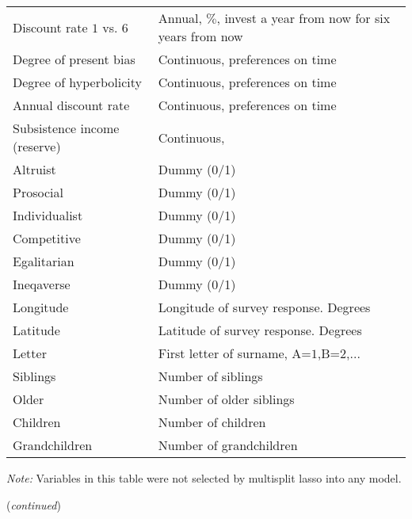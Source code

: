 \documentclass[a4paper,12pt]{article}
\begin{document}
{\begin{threeparttable}
\begin{small}
\begin{tabular}{ll}
\vspace{0.15cm}Discount rate $1$ vs. $6$&Annual, $\%$, invest a year from now for six years from now \\
\vspace{0.15cm}Degree of present bias&Continuous, preferences on time \\
\vspace{0.15cm}Degree of hyperbolicity&Continuous, preferences on time \\
\vspace{0.15cm}Annual discount rate&Continuous, preferences on time \\
\vspace{0.15cm}Subsistence income (reserve)&Continuous, \citet{bergson1954, bergson1938, samuelson1956}\\
\vspace{0.15cm}Altruist&Dummy (0/1)\\
\vspace{0.15cm}Prosocial&Dummy (0/1)\\
\vspace{0.15cm}Individualist&Dummy (0/1)\\
\vspace{0.15cm}Competitive&Dummy (0/1)\\
\vspace{0.15cm}Egalitarian&Dummy (0/1)\\
\vspace{0.15cm}Ineqaverse&Dummy (0/1)\\
\vspace{0.15cm}Longitude&Longitude of survey response. Degrees \\
\vspace{0.15cm}Latitude&Latitude of survey response. Degrees \\
\vspace{0.15cm}Letter&First letter of surname, A=$1$,B=$2$,...\\
\vspace{0.15cm}Siblings&Number of siblings\\
\vspace{0.15cm}Older&Number of older siblings\\
\vspace{0.15cm}Children&Number of children\\
Grandchildren&Number of grandchildren\\
\hline
\end{tabular} 
\end{small}
 \begin{tablenotes}
  \begin{footnotesize}
     \item[~]\textit{Note:} \vspace{-0.35cm} Variables in this table were not selected by multisplit lasso into any model.
      \\    \item[~]\hfill (\textit{continued})
\singlespacing
  \end{footnotesize}
   \end{tablenotes}
  \end{threeparttable} 
\par}
\end{document}
